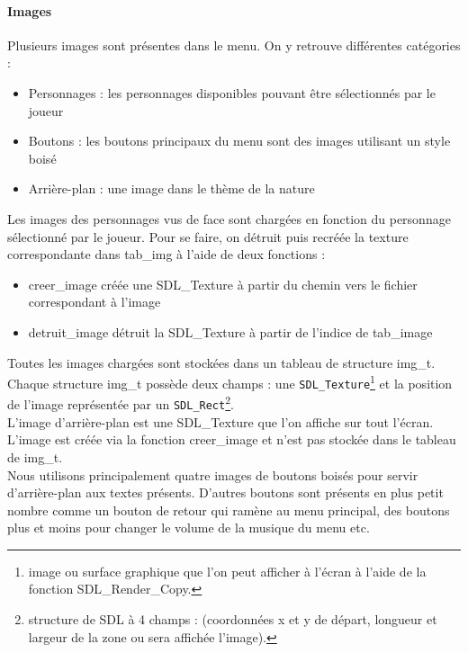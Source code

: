 \documentclass[11pt]{article}
\begin{document}
                \paragraph{Images}\leavevmode\newline
                Plusieurs images sont présentes dans le menu. On y retrouve différentes catégories : 
                \begin{itemize}
                    \item Personnages : les personnages disponibles pouvant être sélectionnés par le joueur
                    \item Boutons : les boutons principaux du menu sont des images utilisant un style boisé
                    \item Arrière-plan : une image dans le thème de la nature 
                \end{itemize}
                \leavevmode\newline
                Les images des personnages vus de face sont chargées en fonction du personnage sélectionné par le joueur. 
                Pour se faire, on détruit puis recréée la texture correspondante dans tab\_img à l’aide de deux fonctions : 
                \begin{itemize}
                    \item creer\_image créée une SDL\_Texture à partir du chemin vers le fichier correspondant à l’image
                    \item detruit\_image détruit la SDL\_Texture à partir de l’indice de tab\_image 
                \end{itemize}
                Toutes les images chargées sont stockées dans un tableau de structure img\_t. Chaque structure img\_t possède deux champs : une \texttt{SDL\_Texture}\footnote{image ou surface graphique que l’on peut afficher à l’écran à l’aide de la fonction SDL\_Render\_Copy.} et la position de l’image représentée par un \texttt{SDL\_Rect}\footnote{structure de SDL à 4 champs : (coordonnées x et y de départ, longueur et largeur de la zone ou sera affichée l’image).}.\\
                L’image d’arrière-plan est une SDL\_Texture que l’on affiche sur tout l’écran. L’image est créée via la fonction creer\_image et n’est pas stockée dans le tableau de img\_t.\\
                Nous utilisons principalement quatre images de boutons boisés pour servir d’arrière-plan aux textes présents. D’autres boutons sont présents en plus petit nombre comme un bouton de retour qui ramène au menu principal, des boutons plus et moins pour changer le volume de la musique du menu etc.\\
\end{document}
